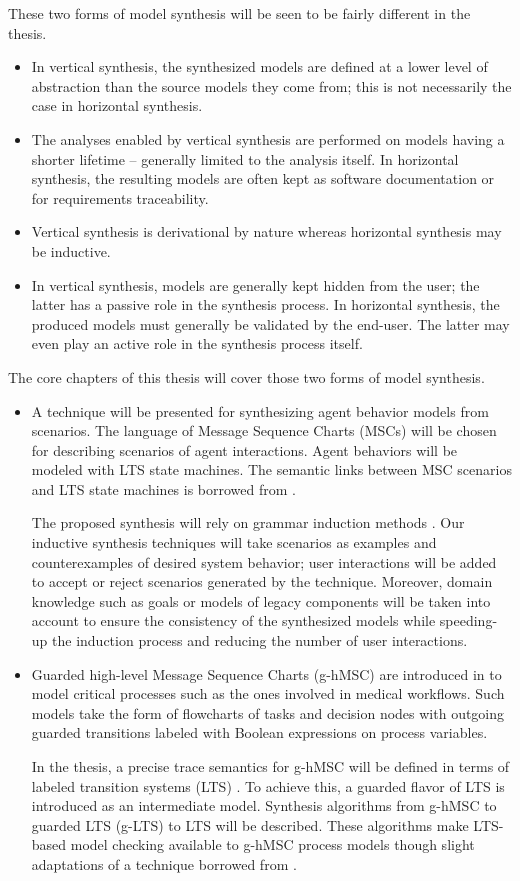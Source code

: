 These two forms of model synthesis will be seen to be fairly different in the thesis.
\begin{itemize}
\item In vertical synthesis, the synthesized models are defined at a lower level of abstraction than the source models they come from; this is not necessarily the case in horizontal synthesis.
\item The analyses enabled by vertical synthesis are performed on models having a shorter lifetime -- generally limited to the analysis itself. In horizontal synthesis, the resulting models are often kept as software documentation or for requirements traceability. 
\item Vertical synthesis is derivational by nature whereas horizontal synthesis may be inductive.
\item In vertical synthesis, models are generally kept hidden from the user; the latter has a passive role in the synthesis process. In horizontal synthesis, the produced models must generally be validated by the end-user. The latter may even play an active role in the synthesis process itself.
\end{itemize}

The core chapters of this thesis will cover those two forms of model synthesis.
\begin{itemize}
\item A technique will be presented for synthesizing agent behavior models from scenarios. The language of Message Sequence Charts (MSCs) will be chosen for describing scenarios of agent interactions. Agent behaviors will be modeled with LTS state machines. The semantic links between MSC scenarios and LTS state machines is borrowed from \cite{Uchitel:2003}.

The proposed synthesis will rely on grammar induction methods \cite{Oncina:1992, Lang:1998}. Our inductive synthesis techniques will take scenarios as examples and counterexamples of desired system behavior; user interactions will be added to accept or reject scenarios generated by the technique. Moreover, domain knowledge such as goals or models of legacy components will be taken into account to ensure the consistency of the synthesized models while speeding-up the induction process and reducing the number of user interactions.

\item Guarded high-level Message Sequence Charts (g-hMSC) are introduced in \cite{Damas:2010, Damas:2011} to model critical processes such as the ones involved in medical workflows. Such models take the form of flowcharts of tasks and decision nodes with outgoing guarded transitions labeled with Boolean expressions on process variables. 

In the thesis, a precise trace semantics for g-hMSC will be defined in terms of labeled transition systems (LTS) \cite{Keller:1976, Magee:1999}. To achieve this, a guarded flavor of LTS is introduced as an intermediate model. Synthesis algorithms from g-hMSC to guarded LTS (g-LTS) to LTS will be described. These algorithms make LTS-based model checking available to g-hMSC process models though slight adaptations of a technique borrowed from \cite{Giannakopoulou:2003}.
\end{itemize}

